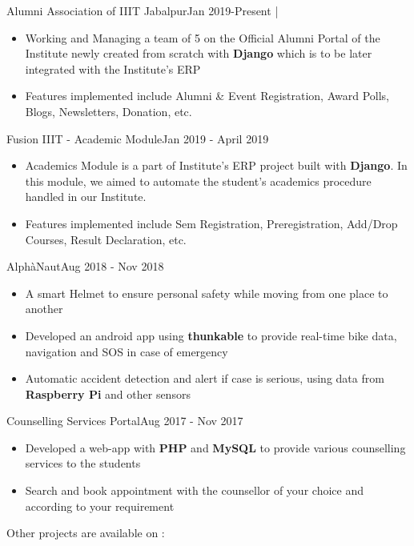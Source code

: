 
\begin{projects}
    \project
	{Alumni Association of IIIT Jabalpur}{Jan 2019-Present}
	{ |\quad {}}
	{
	    \begin{itemize}
	        \vspace{-5mm}
            \item Working and Managing a team of 5 on the Official Alumni Portal of the Institute newly created from scratch with \textbf{Django} which is to be later integrated with the Institute’s ERP
            \item Features implemented include Alumni \& Event Registration, Award Polls, Blogs, Newsletters, Donation, etc.
        \end{itemize}
	}
	
	\project
	{Fusion IIIT - Academic Module}{Jan 2019 - April 2019}
	{}
	{
	    \begin{itemize}
	        \vspace{-5mm}
            \item Academics Module is a part of Institute’s ERP project built with \textbf{Django}. In this module, we aimed to automate the student’s academics procedure handled in our Institute.
            \item Features implemented include Sem Registration, Preregistration, Add/Drop Courses, Result Declaration, etc.
        \end{itemize}
	}
	
	\project
	{AlphàNaut}{Aug 2018 - Nov 2018}
	{}
	{
	    \begin{itemize}
	        \vspace{-5mm}
            \item A smart Helmet to ensure personal safety while moving from one place to another
            \item Developed an android app using \textbf{thunkable} to provide real-time bike data, navigation and SOS in case of emergency
            \item Automatic accident detection and alert if case is serious, using data from \textbf{Raspberry Pi} and other sensors
        \end{itemize}
	}
	
	\project
	{Counselling Services Portal}{Aug 2017 - Nov 2017}
	{}
	{
	    \begin{itemize}
	        \vspace{-5mm}
            \item Developed a web-app with \textbf{PHP} and \textbf{MySQL} to provide various counselling services to the students
            \item Search and book appointment with the counsellor of your choice and according to your requirement
        \end{itemize}
	}
\end{projects}
\vspace{-5mm}
Other projects are available on : 